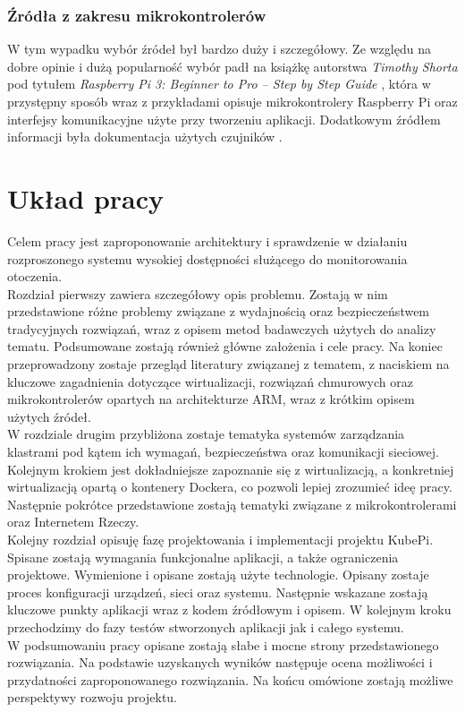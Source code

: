 \documentclass[12pt]{report}
\let\Oldsection\section
\renewcommand{\section}{\FloatBarrier\Oldsection}
\let\Oldsubsubsection\subsubsection
\renewcommand{\subsubsection}{\FloatBarrier\Oldsubsubsection}
\begin{document}
\subsubsection{Źródła z zakresu mikrokontrolerów}
	\indent W tym wypadku wybór źródeł był bardzo duży i szczegółowy. Ze względu na dobre opinie i dużą popularność wybór padł na książkę autorstwa \textit{Timothy Shorta} pod tytułem \textit{Raspberry Pi 3: Beginner to Pro – Step by Step Guide} \cite{raspberry}, która w przystępny sposób wraz z przykładami opisuje mikrokontrolery Raspberry Pi oraz interfejsy komunikacyjne użyte przy tworzeniu aplikacji. Dodatkowym źródłem informacji była dokumentacja użytych czujników \cite{ds18b20Doc} \cite{max7219Doc} \cite{dht11Doc}  \cite{mq3Doc}.
	
\section{Układ pracy}
Celem pracy jest zaproponowanie architektury i sprawdzenie w działaniu rozproszonego systemu wysokiej dostępności służącego do monitorowania otoczenia. \\
\indent Rozdział pierwszy zawiera szczegółowy opis problemu. Zostają w nim przedstawione różne problemy związane z wydajnością oraz bezpieczeństwem tradycyjnych rozwiązań, wraz z opisem metod badawczych użytych do analizy tematu. Podsumowane zostają również główne założenia i cele pracy. Na koniec przeprowadzony zostaje przegląd literatury związanej z tematem, z naciskiem na kluczowe zagadnienia dotyczące wirtualizacji, rozwiązań chmurowych oraz mikrokontrolerów opartych na architekturze ARM, wraz z krótkim opisem użytych źródeł. \\
\indent W rozdziale drugim przybliżona zostaje tematyka systemów zarządzania klastrami pod kątem ich wymagań, bezpieczeństwa oraz komunikacji sieciowej. Kolejnym krokiem jest dokładniejsze zapoznanie się z wirtualizacją, a konkretniej wirtualizacją opartą o kontenery Dockera, co pozwoli lepiej zrozumieć ideę pracy. Następnie pokrótce przedstawione zostają tematyki związane z mikrokontrolerami oraz Internetem Rzeczy. \\
\indent Kolejny rozdział opisuję fazę projektowania i implementacji projektu KubePi. Spisane zostają wymagania funkcjonalne aplikacji, a także ograniczenia projektowe. Wymienione i opisane zostają użyte technologie. Opisany zostaje proces konfiguracji urządzeń, sieci oraz systemu. Następnie wskazane zostają kluczowe punkty aplikacji wraz z kodem źródłowym i opisem. W kolejnym kroku przechodzimy do fazy testów stworzonych aplikacji jak i całego systemu. \\
\indent W podsumowaniu pracy opisane zostają słabe i mocne strony przedstawionego rozwiązania. Na podstawie uzyskanych wyników następuje ocena możliwości i przydatności zaproponowanego rozwiązania. Na końcu omówione zostają możliwe perspektywy rozwoju projektu.
\end{document}
